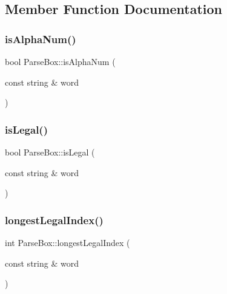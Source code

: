 \subsection{Member Function Documentation}
\mbox{\label{class_parse_box_a1c999341d7659ddd79cb0817fafbd912}} 
\subsubsection{\texorpdfstring{is\+Alpha\+Num()}{isAlphaNum()}}
{\footnotesize\ttfamily bool Parse\+Box\+::is\+Alpha\+Num (\begin{DoxyParamCaption}\item[{const string \&}]{word }\end{DoxyParamCaption})}

\mbox{\label{class_parse_box_ac70b7819c006993a9586586b8aaed3ef}} 
\subsubsection{\texorpdfstring{is\+Legal()}{isLegal()}}
{\footnotesize\ttfamily bool Parse\+Box\+::is\+Legal (\begin{DoxyParamCaption}\item[{const string \&}]{word }\end{DoxyParamCaption})}

\mbox{\label{class_parse_box_a31a51bf2e3ac4b3d080ed16715cb91f7}} 
\subsubsection{\texorpdfstring{longest\+Legal\+Index()}{longestLegalIndex()}}
{\footnotesize\ttfamily int Parse\+Box\+::longest\+Legal\+Index (\begin{DoxyParamCaption}\item[{const string \&}]{word }\end{DoxyParamCaption})}

\mbox{\label{class_parse_box_a609f48172e85c1aab7ecfd8b85d1aeaf}} 
